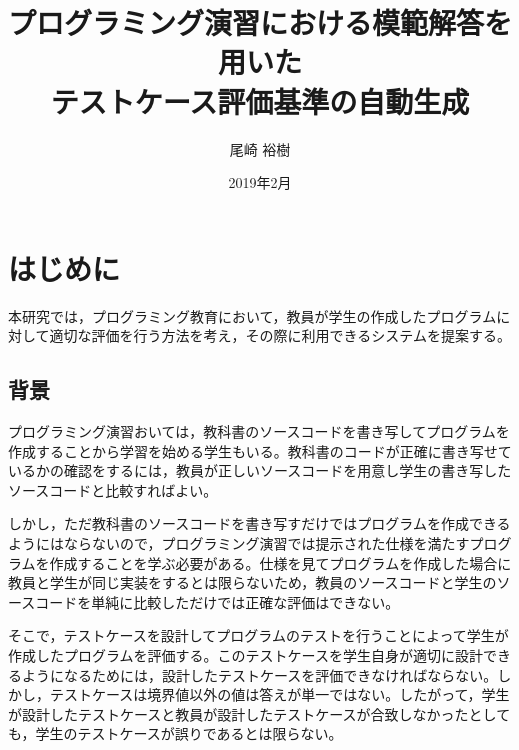\documentclass{tpu-sotu}
\author{尾崎 裕樹}
\title{プログラミング演習における模範解答を用いた\\テストケース評価基準の自動生成}
\date{2019年2月}
\begin{document}
%
\maketitle
\clearpage
{}
\tableofcontents
\clearpage
{}
%

%
\chapter{はじめに}
本研究では，プログラミング教育において，教員が学生の作成したプログラムに対して適切な評価を行う方法を考え，その際に利用できるシステムを提案する。
\section{背景}
プログラミング演習おいては，教科書のソースコードを書き写してプログラムを作成することから学習を始める学生もいる。教科書のコードが正確に書き写せているかの確認をするには，教員が正しいソースコードを用意し学生の書き写したソースコードと比較すればよい。

しかし，ただ教科書のソースコードを書き写すだけではプログラムを作成できるようにはならないので，プログラミング演習では提示された仕様を満たすプログラムを作成することを学ぶ必要がある。仕様を見てプログラムを作成した場合に教員と学生が同じ実装をするとは限らないため，教員のソースコードと学生のソースコードを単純に比較しただけでは正確な評価はできない。

そこで，テストケースを設計してプログラムのテストを行うことによって学生が作成したプログラムを評価する。このテストケースを学生自身が適切に設計できるようになるためには，設計したテストケースを評価できなければならない。しかし，テストケースは境界値以外の値は答えが単一ではない。したがって，学生が設計したテストケースと教員が設計したテストケースが合致しなかったとしても，学生のテストケースが誤りであるとは限らない。
\end{document}
